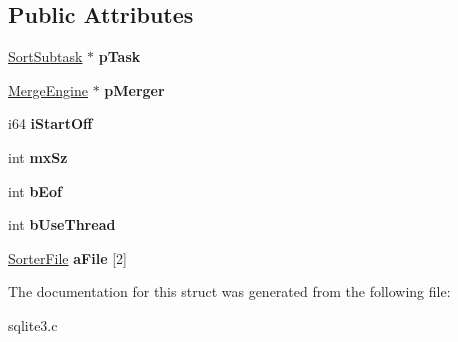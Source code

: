 \subsection*{Public Attributes}
\begin{DoxyCompactItemize}
\item 
\hyperlink{structSortSubtask}{Sort\+Subtask} $\ast$ {\bfseries p\+Task}\hypertarget{structIncrMerger_a2b941a6bbca7d5c0fc0c0391c44eccda}{}\label{structIncrMerger_a2b941a6bbca7d5c0fc0c0391c44eccda}

\item 
\hyperlink{structMergeEngine}{Merge\+Engine} $\ast$ {\bfseries p\+Merger}\hypertarget{structIncrMerger_ac7335fe89a94112b63e206ac48656f4e}{}\label{structIncrMerger_ac7335fe89a94112b63e206ac48656f4e}

\item 
i64 {\bfseries i\+Start\+Off}\hypertarget{structIncrMerger_a88153aef88037ccac55eb5c9209a3e1b}{}\label{structIncrMerger_a88153aef88037ccac55eb5c9209a3e1b}

\item 
int {\bfseries mx\+Sz}\hypertarget{structIncrMerger_a333e98e9e5e951e2e00a109a95c4fbab}{}\label{structIncrMerger_a333e98e9e5e951e2e00a109a95c4fbab}

\item 
int {\bfseries b\+Eof}\hypertarget{structIncrMerger_af9ebc9bf53d72441086d98e379ca2721}{}\label{structIncrMerger_af9ebc9bf53d72441086d98e379ca2721}

\item 
int {\bfseries b\+Use\+Thread}\hypertarget{structIncrMerger_a5c4a9d27ce78f3edaa91c5d85c0f3474}{}\label{structIncrMerger_a5c4a9d27ce78f3edaa91c5d85c0f3474}

\item 
\hyperlink{structSorterFile}{Sorter\+File} {\bfseries a\+File} \mbox{[}2\mbox{]}\hypertarget{structIncrMerger_a276ff9bd9d3c7c9609cdfde70127bcc3}{}\label{structIncrMerger_a276ff9bd9d3c7c9609cdfde70127bcc3}

\end{DoxyCompactItemize}


The documentation for this struct was generated from the following file\+:\begin{DoxyCompactItemize}
\item 
sqlite3.\+c\end{DoxyCompactItemize}
